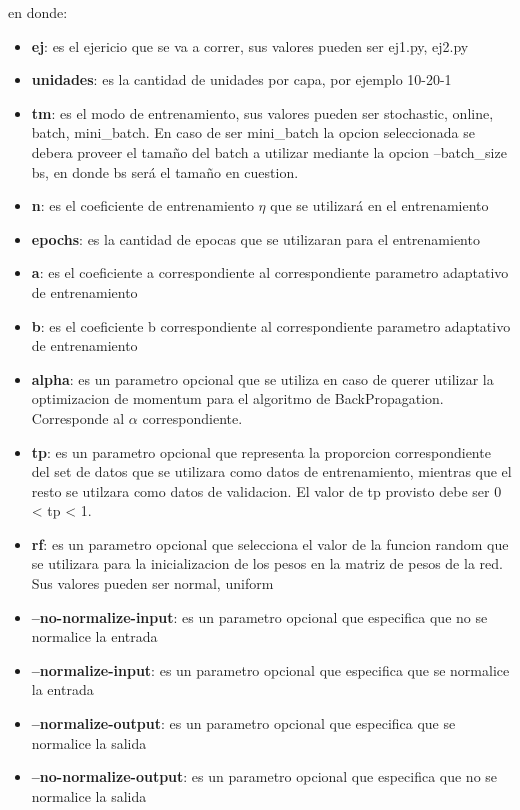 en donde:
\begin{itemize}
  \item \textbf{ej}: es el ejericio que se va a correr, sus valores pueden ser {ej1.py, ej2.py}
  \item \textbf{unidades}: es la cantidad de unidades por capa, por ejemplo 10-20-1
  \item \textbf{tm}: es el modo de entrenamiento, sus valores pueden ser {stochastic, online, batch, mini\_batch}. En caso de ser mini\_batch la opcion seleccionada se debera
            proveer el tamaño del batch a utilizar mediante la opcion --batch\_size bs, en donde bs será el tamaño en cuestion.
  \item \textbf{n}: es el coeficiente de entrenamiento $\eta$ que se utilizará en el entrenamiento
  \item \textbf{epochs}: es la cantidad de epocas que se utilizaran para el entrenamiento
  \item \textbf{a}: es el coeficiente a correspondiente al correspondiente parametro adaptativo de entrenamiento
  \item \textbf{b}: es el coeficiente b correspondiente al correspondiente parametro adaptativo de entrenamiento
  \item \textbf{alpha}: es un parametro opcional que se utiliza en caso de querer utilizar la optimizacion de momentum para el algoritmo de BackPropagation. Corresponde al $\alpha$
                correspondiente.
  \item \textbf{tp}: es un parametro opcional que representa la proporcion correspondiente del set de datos que se utilizara como datos de entrenamiento,
            mientras que el resto se utilzara como datos de validacion. El valor de tp provisto debe ser 0 < tp < 1.
  \item \textbf{rf}: es un parametro opcional que selecciona el valor de la funcion random que se utilizara para la inicializacion de los pesos en la matriz de pesos de la red.
            Sus valores pueden ser {normal, uniform}
  \item \textbf{--no-normalize-input}: es un parametro opcional que especifica que no se normalice la entrada
  \item \textbf{--normalize-input}: es un parametro opcional que especifica que se normalice la entrada
  \item \textbf{--normalize-output}: es un parametro opcional que especifica que se normalice la salida
  \item \textbf{--no-normalize-output}: es un parametro opcional que especifica que no se normalice la salida
\end{itemize}

